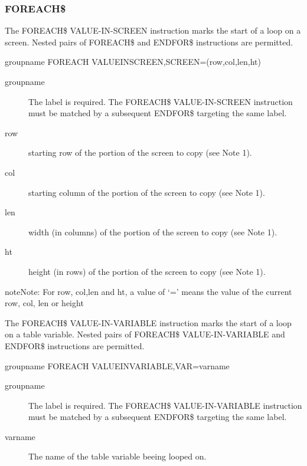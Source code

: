 \documentclass[letterpaper,10pt,english]{sphinxmanual}
\begin{document}
\subsubsection{FOREACH\$}
\label{\detokenize{User_Guide:foreach}}

The FOREACH\$ VALUE-IN-SCREEN instruction marks the start of a loop on a screen. Nested pairs of FOREACH\$ and ENDFOR\$ instructions are permitted.

\begin{sphinxVerbatim}[commandchars=\\\{\}]
groupname FOREACH\PYGZdl{} VALUE\PYGZhy{}IN\PYGZhy{}SCREEN,SCREEN=(row,col,len,ht)
\end{sphinxVerbatim}
\begin{description}
\item[{groupname}] \leavevmode
The label is required. The FOREACH\$ VALUE-IN-SCREEN instruction must be matched by a subsequent ENDFOR\$ targeting the same label.

\item[{row}] \leavevmode
starting row of the portion of the screen to copy (see Note 1).

\item[{col}] \leavevmode
starting column of the portion of the screen to copy (see Note 1).

\item[{len}] \leavevmode
width (in columns) of the portion of the screen to copy (see Note 1).

\item[{ht}] \leavevmode
height (in rows) of the portion of the screen to copy (see Note 1).

\end{description}

\begin{sphinxadmonition}{note}{Note:}
For row, col,len and ht, a value of ‘=’ means the value of the current row, col, len or height
\end{sphinxadmonition}
\label{\detokenize{User_Guide:v457ug-foreach-variable}}

The FOREACH\$ VALUE-IN-VARIABLE instruction marks the start of a loop on a table variable. Nested pairs of FOREACH\$
VALUE-IN-VARIABLE and ENDFOR\$ instructions are permitted.

\begin{sphinxVerbatim}[commandchars=\\\{\}]
groupname FOREACH\PYGZdl{} VALUE\PYGZhy{}IN\PYGZhy{}VARIABLE,VAR=\PYGZsq{}varname\PYGZsq{}
\end{sphinxVerbatim}
\begin{description}
\item[{groupname}] \leavevmode
The label is required. The FOREACH\$ VALUE-IN-VARIABLE instruction must be matched by a subsequent ENDFOR\$ targeting the same label.

\item[{varname}] \leavevmode
The name of the table variable beeing looped on.

\end{description}
\end{document}
